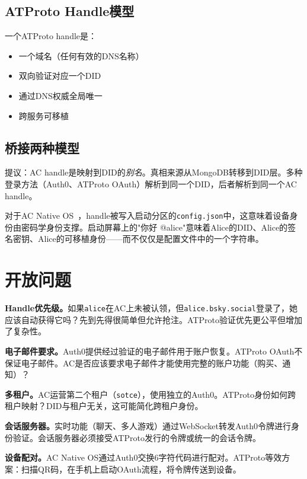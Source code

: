 \documentclass[10pt,letterpaper,twocolumn]{article}
\begin{document}
\subsection{ATProto Handle模型}

一个ATProto handle是：
\begin{itemize}
  \item 一个域名（任何有效的DNS名称）
  \item 双向验证对应一个DID
  \item 通过DNS权威全局唯一
  \item 跨服务可移植
\end{itemize}

\subsection{桥接两种模型}

提议：AC handle是映射到DID的\emph{别名}。真相来源从MongoDB转移到DID层。多种登录方法（Auth0、ATProto OAuth）解析到同一个DID，后者解析到同一个AC handle。

对于AC Native OS~\citep{scudder2026os}，handle被写入启动分区的\texttt{config.json}中，这意味着设备身份由密码学身份支撑。启动屏幕上的"你好 @alice"意味着Alice的DID、Alice的签名密钥、Alice的可移植身份——而不仅仅是配置文件中的一个字符串。


\section{开放问题}
\label{sec:questions}

\textbf{Handle优先级。}如果\texttt{alice}在AC上未被认领，但\texttt{alice.bsky.social}登录了，她应该自动获得它吗？先到先得很简单但允许抢注。ATProto验证优先更公平但增加了复杂性。

\textbf{电子邮件要求。}Auth0提供经过验证的电子邮件用于账户恢复。ATProto OAuth不保证电子邮件。AC是否应该要求电子邮件才能使用完整的账户功能（购买、通知）？

\textbf{多租户。}AC运营第二个租户（\texttt{sotce}），使用独立的Auth0。ATProto身份如何跨租户映射？DID与租户无关，这可能简化跨租户身份。

\textbf{会话服务器。}实时功能（聊天、多人游戏）通过WebSocket转发Auth0令牌进行身份验证。会话服务器必须接受ATProto发行的令牌或统一的会话令牌。

\textbf{设备配对。}AC Native OS通过Auth0交换6字符代码进行配对。ATProto等效方案：扫描QR码，在手机上启动OAuth流程，将令牌传送到设备。
\end{document}
